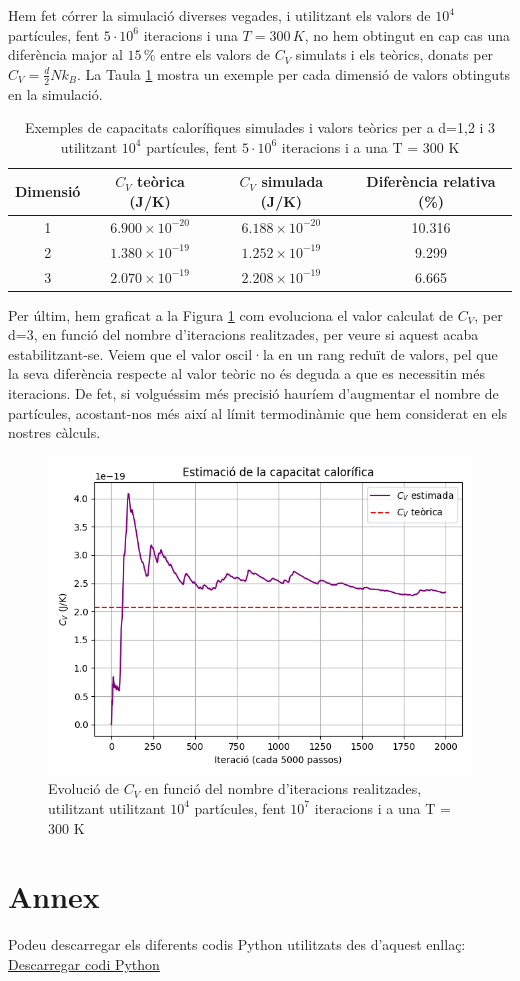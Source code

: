 \documentclass{article}
\begin{document}
	\noindent Hem fet córrer la simulació diverses vegades, i utilitzant els valors de $10^4$ partícules, fent $5 \cdot 10^6$ iteracions i una $T =  300 \, K$, no hem obtingut en cap cas una diferència major al $15 \, \%$ entre els valors de $C_V$ simulats i els teòrics, donats per $C_V = \frac{d}{2}Nk_B$. La Taula \ref{taula_comparacio} mostra un exemple per cada dimensió de valors obtinguts en la simulació.
	
	\begin{table}[h!]
		\centering
		\begin{tabular}{|c|c|c|c|}
			\hline
			\textbf{Dimensió} & \textbf{$C_V$ teòrica (J/K)} & \textbf{$C_V$ simulada (J/K)} & \textbf{Diferència relativa (\%)} \\ \hline
			1 & $6.900 \times 10^{-20}$ & $6.188 \times 10^{-20}$ & 10.316 \\ \hline
			2 & $1.380 \times 10^{-19}$ & $1.252 \times 10^{-19}$ & 9.299 \\ \hline
			3 & $2.070 \times 10^{-19}$ & $2.208 \times 10^{-19}$ & 6.665 \\ \hline
		\end{tabular}
		\caption{Exemples de capacitats calorífiques simulades i valors teòrics per a d=1,2 i 3 utilitzant $10^4$ partícules, fent $5 \cdot 10^6$ iteracions i a una T = 300 K}
		\label{taula_comparacio}
	\end{table}
	
	Per últim, hem graficat a la Figura \ref{figura_evolucio_C_V}  com evoluciona el valor calculat de $C_V$, per d=3, en funció del nombre d'iteracions realitzades, per veure si aquest acaba estabilitzant-se. Veiem que el valor oscil·la en un rang reduït de valors, pel que la seva diferència respecte al valor teòric no és deguda a que es necessitin més iteracions. De fet, si volguéssim més precisió hauríem d'augmentar el nombre de partícules, acostant-nos més així al límit termodinàmic que hem considerat en els nostres càlculs. 
	
\begin{figure}[h!]
	\centering
	\includegraphics[width=0.7\linewidth]{MonteCarlo.png}
	\caption{Evolució de $C_V$ en funció del nombre d'iteracions realitzades, utilitzant utilitzant $10^4$ partícules, fent $10^7$ iteracions i a una T = 300 K}
	\label{figura_evolucio_C_V}
\end{figure}

\newpage

\section*{Annex}
Podeu descarregar els diferents codis Python utilitzats des d'aquest enllaç: \\
\href{https://drive.google.com/drive/folders/15ynOzz0lKhWNOVCDJGllM2V2zCnDKDyw}{Descarregar codi Python}
	
	
\end{document}
